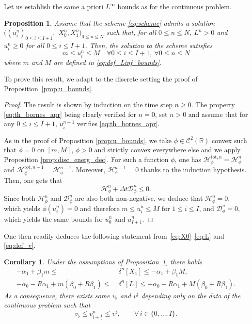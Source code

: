 \documentclass{amsart}
\newcommand\dt{\Delta t}
\newcommand\R{\mathbb{R}}
\renewcommand\H{\mathcal{H}_{\phi}}
\newtheorem{corollary}[theorem]{Corollary}
\newtheorem{proposition}[theorem]{Proposition}
\begin{document}
	Let us establish the same a priori $L^{\infty}$ bounds as for the continuous problem.
	\begin{proposition} \label{th:bornes_apr}
	    Assume that the scheme \eqref{eq:scheme} admits a solution $((u_i^n)_{0 \leq i \leq I+1},$  $X_0^n, X_1^n)_{0 \leq n \leq N}$ such that, for all $0\leq n\leq N$, $L^n>0$ and $u_i^n\geq 0 $ for all $0\leq i\leq I+1$. Then, the solution to the scheme satisfies 
		\begin{equation} \label{eq:th_bornes_apr}
			m \leq u_i^n \leq M \quad \forall 0\leq i\leq I+1,\ \forall 0\leq n\leq N
		\end{equation}
		where $m$ and $M$ are defined in \eqref{eq:def_Linf_bounds}.
	\end{proposition}
	To prove this result, we adapt to the discrete setting the proof of Proposition~\ref{prop:u_bounds}.
	\begin{proof}
		The result is shown by induction on the time step $n \geq 0$. The property \eqref{eq:th_bornes_apr} being clearly verified for $n=0$,
     set $n > 0$ and assume that for any $0 \leq i \leq I+1$, $u_i^{n-1}$ verifies \eqref{eq:th_bornes_apr}. 
     
     As in the proof of Proposition \ref{prop:u_bounds}, we take $\phi \in \mathcal{C}^2(\R)$ convex such that $\phi = 0$ on $[m,M]$, $\phi > 0$ and strictly convex everywhere else and we apply Proposition \ref{prop:disc_energ_dec}.
	 For such a function $\phi$, one has 
	 $\H^{{\text{tot}},n} = \H^n$ and $\H^{{\text{tot}},n-1} = \H^{n-1}$. Moreover, $\H^{n-1} = 0$ thanks to the induction hypothesis. Then, one gets that
    \begin{equation*}
		\H^n + \dt \mathcal{D}^n_{\phi} \leq 0.
    \end{equation*}
Since both $\H^n$ and $\mathcal{D}^n_{\phi}$ are also both non-negative, we deduce that \(\H^n = 0\), which yields $\phi(u_i^n) = 0$ and therefore $m\leq u_i^n\leq M$ for $1\leq i\leq I$, and \(\mathcal{D}^n_{\phi} = 0,\) which yields the same bounds for $u_0^n$ and $u_{I+1}^n$.
	\end{proof}
	
One then readily deduces the following statement from~\eqref{eq:X0}--\eqref{eq:L} and \eqref{eq:def_v}.
	\begin{corollary}\label{coro:bounds.vitesse} Under the assumptions of Proposition~\ref{th:bornes_apr}, there holds
	\begin{align}\label{eq:bound.deltaX1}
	 - \alpha_1 + \beta_1 m  \leq &\; \delta^n[X_1] \leq - \alpha_1 + \beta_1 M, \\
	 - \alpha_0 - R\alpha_1 + m(\beta_0 + R \beta_1)  \leq &\; \delta^n[L] \leq   - \alpha_0 - R\alpha_1 + M(\beta_0 + R \beta_1). 
	 \label{eq:bound.deltaL}
	\end{align}
	As a consequence, there exists some $v_\flat$ and $v^\sharp$ depending only on the data of the continuous problem such that 
	\begin{equation}\label{eq:bound.v}
	v_\flat \leq v_{i+\frac12}^n \leq v^\sharp, \qquad \forall \, i \in \{0,\dots, I\}.
	\end{equation}
	\end{corollary}
\end{document}
